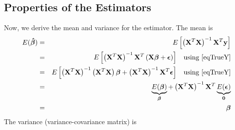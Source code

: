 \documentclass[11pt]{article}
\theoremstyle{remark}
\begin{document}
\subsection{Properties of the Estimators}
Now, we derive the mean and variance for the estimator. The mean is
\begin{eqnarray}
E(\boldsymbol{\hat{\beta}}) &=& E\left[  \left(\mathbf{X}^T\mathbf{X}\right)^{-1}\mathbf{X}^T\mathbf{y} \right]\nonumber\\
&=& E\left[  \left(\mathbf{X}^T\mathbf{X}\right)^{-1}\mathbf{X}^T\left(\mathbf{X}\boldsymbol{\beta} + \boldsymbol{\epsilon}\right) \right]\:\:\:\:\text{using \eqref{eqTrueY}}\nonumber\\
&=& E\left[  \left(\mathbf{X}^T\mathbf{X}\right)^{-1}\left(\mathbf{X}^T\mathbf{X}\right)\boldsymbol{\beta} + \left(\mathbf{X}^T\mathbf{X}\right)^{-1}\mathbf{X}^T\boldsymbol{\epsilon} \right]\:\:\:\:\text{using \eqref{eqTrueY}}\nonumber\\
&=& \underbrace{E(\boldsymbol{\beta})}_{\boldsymbol{\beta}}+ \left(\mathbf{X}^T\mathbf{X}\right)^{-1}\mathbf{X}^T\underbrace{E(\boldsymbol{\epsilon})}_{\mathbf{0}}\nonumber\\
&=& \boldsymbol{\beta} \label{MeanEstimatorBeta}
\end{eqnarray}
The variance (variance-covariance matrix) is
\end{document}
